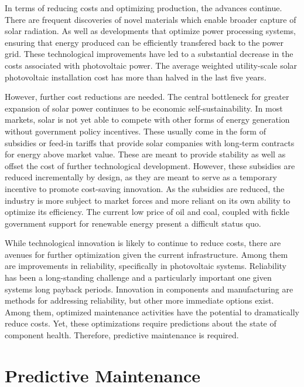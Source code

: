 In terms of reducing costs and optimizing production, the advances continue. There are frequent discoveries of novel materials which enable broader capture of solar radiation\cite{Anguita2016}. As well as developments that optimize power processing systems, ensuring that energy produced can be efficiently transfered back to the power grid\cite{Weckx2014}. These technological improvements have led to a substantial decrease in the costs associated with photovoltaic power. The average weighted utility-scale solar photovoltaic installation cost has more than halved in the last five years\cite{IRENA2016}.

However, further cost reductions are needed. The central bottleneck for greater expansion of solar power continues to be economic self-sustainability. In most markets, solar is not yet able to compete with other forms of energy generation without  government policy incentives\cite{OECD2011}. These usually come in the form of subsidies or feed-in tariffs that provide solar companies with long-term contracts for energy above market value. These are meant to provide stability as well as offset the cost of further technological development\cite{Couture2010}. However, these subsidies are reduced incrementally by design, as they are meant to serve as a temporary incentive to promote cost-saving innovation. As the subsidies are reduced, the industry is more subject to market forces and more reliant on its own ability to optimize its efficiency. The current low price of oil and coal, coupled with fickle government support for renewable energy\cite{FrankfurtSchool2016} present a difficult status quo\cite{Hals2016}. 

While technological innovation is likely to continue to reduce costs, there are avenues for further optimization given the current infrastructure. Among them are improvements in reliability, specifically in photovoltaic systems. Reliability has been a long-standing challenge\cite{Petrone2008} and a particularly important one given systems long payback periods\cite{Moore2008}. Innovation in components and manufacturing are methods for addressing reliability, but other more immediate options exist. Among them, optimized maintenance activities have the potential to dramatically reduce costs. Yet, these optimizations require predictions about the state of component health. Therefore, predictive maintenance is required.

\section{Predictive Maintenance}

